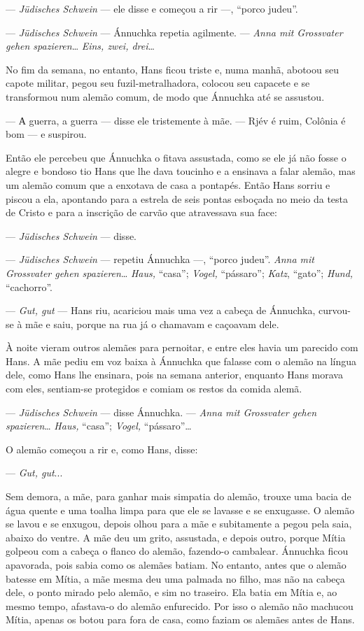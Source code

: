 --- \emph{Jüdisches Schwein} --- ele disse e começou a rir ---, ``porco
judeu''.

--- \emph{Jüdisches Schwein} --- Ánnuchka repetia agilmente. ---
\emph{Anna mit Grossvater gehen spazieren}\ldots{} \emph{Eins, zwei,
drei}\ldots{}

No fim da semana, no entanto, Hans ficou triste e, numa manhã, abotoou
seu capote militar, pegou seu fuzil-metralhadora, colocou seu capacete e
se transformou num alemão comum, de modo que Ánnuchka até se assustou.

--- А guerra, a guerra --- disse ele tristemente à mãe. --- Rjév é ruim,
Colônia é bom --- e suspirou.

Então ele percebeu que Ánnuchka o fitava assustada, como se ele já não
fosse o alegre e bondoso tio Hans que lhe dava toucinho e a ensinava a
falar alemão, mas um alemão comum que a enxotava de casa a pontapés.
Então Hans sorriu e piscou a ela, apontando para a estrela de seis
pontas esboçada no meio da testa de Cristo e para a inscrição de carvão
que atravessava sua face:

--- \emph{Jüdisches Schwein} --- disse.

--- \emph{Jüdisches Schwein} --- repetiu Ánnuchka ---, ``porco judeu''.
\emph{Anna mit Grossvater gehen spazieren}\ldots{} \emph{Haus,}
``casa''; \emph{Vogel,} ``pássaro''; \emph{Katz}, ``gato''; \emph{Hund,}
``cachorro''.

--- \emph{Gut, gut} --- Hans riu, acariciou mais uma vez a cabeça de
Ánnuchka, curvou-se à mãe e saiu, porque na rua já o chamavam e caçoavam
dele.

À noite vieram outros alemães para pernoitar, e entre eles havia um
parecido com Hans. A mãe pediu em voz baixa à Ánnuchka que falasse com o
alemão na língua dele, como Hans lhe ensinara, pois na semana anterior,
enquanto Hans morava com eles, sentiam-se protegidos e comiam os restos
da comida alemã.

--- \emph{Jüdisches Schwein} --- disse Ánnuchka. --- \emph{Anna mit
Grossvater gehen spazieren}\ldots{} \emph{Haus,} ``casa''; \emph{Vogel,}
``pássaro''\ldots{}

O alemão começou a rir e, como Hans, disse:

--- \emph{Gut, gut}...

Sem demora, a mãe, para ganhar mais simpatia do alemão, trouxe uma bacia
de água quente e uma toalha limpa para que ele se lavasse e se
enxugasse. O alemão se lavou e se enxugou, depois olhou para a mãe e
subitamente a pegou pela saia, abaixo do ventre. A mãe deu um grito,
assustada, e depois outro, porque Mítia golpeou com a cabeça o flanco do
alemão, fazendo-o cambalear. Ánnuchka ficou apavorada, pois sabia como
os alemães batiam. No entanto, antes que o alemão batesse em Mítia, a
mãe mesma deu uma palmada no filho, mas não na cabeça dele, o ponto
mirado pelo alemão, e sim no traseiro. Ela batia em Mítia e, ao mesmo
tempo, afastava-o do alemão enfurecido. Por isso o alemão não machucou
Mítia, apenas os botou para fora de casa, como faziam os alemães antes
de Hans.

